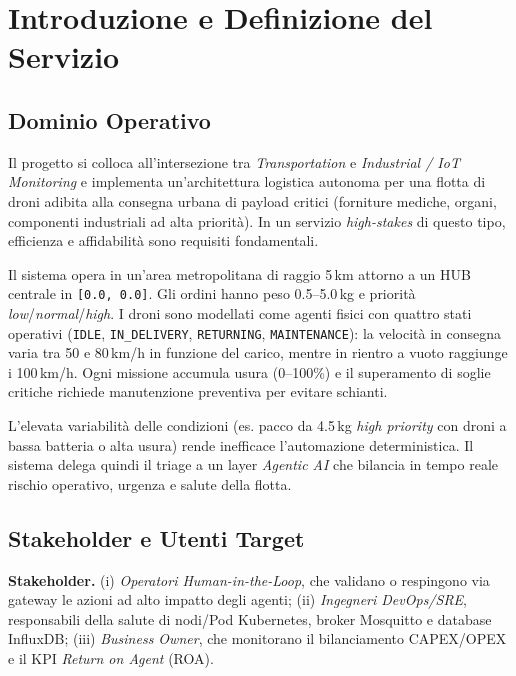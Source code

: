 
\chapter{Introduzione e Definizione del Servizio}
\label{cap:introduzione_definizione}

\section{Dominio Operativo}
\label{sec:dominio_operativo}

Il progetto si colloca all'intersezione tra \textit{Transportation} e \textit{Industrial / IoT Monitoring} e implementa un'architettura logistica autonoma per una flotta di droni adibita alla consegna urbana di payload critici (forniture mediche, organi, componenti industriali ad alta priorità). In un servizio \textit{high-stakes} di questo tipo, efficienza e affidabilità sono requisiti fondamentali.

Il sistema opera in un'area metropolitana di raggio 5\,km attorno a un HUB centrale in \texttt{[0.0, 0.0]}. Gli ordini hanno peso 0.5--5.0\,kg e priorità \textit{low}/\textit{normal}/\textit{high}. I droni sono modellati come agenti fisici con quattro stati operativi (\texttt{IDLE}, \texttt{IN\_DELIVERY}, \texttt{RETURNING}, \texttt{MAINTENANCE}): la velocità in consegna varia tra 50 e 80\,km/h in funzione del carico, mentre in rientro a vuoto raggiunge i 100\,km/h. Ogni missione accumula usura (0--100\%) e il superamento di soglie critiche richiede manutenzione preventiva per evitare schianti.

L'elevata variabilità delle condizioni (es. pacco da 4.5\,kg \textit{high priority} con droni a bassa batteria o alta usura) rende inefficace l'automazione deterministica. Il sistema delega quindi il triage a un layer \textit{Agentic AI} che bilancia in tempo reale rischio operativo, urgenza e salute della flotta.

\section{Stakeholder e Utenti Target}
\label{sec:stakeholder_utenti}

\textbf{Stakeholder.} (i) \textit{Operatori Human-in-the-Loop}, che validano o respingono via gateway le azioni ad alto impatto degli agenti; (ii) \textit{Ingegneri DevOps/SRE}, responsabili della salute di nodi/Pod Kubernetes, broker Mosquitto e database InfluxDB; (iii) \textit{Business Owner}, che monitorano il bilanciamento CAPEX/OPEX e il KPI \textit{Return on Agent} (ROA).

